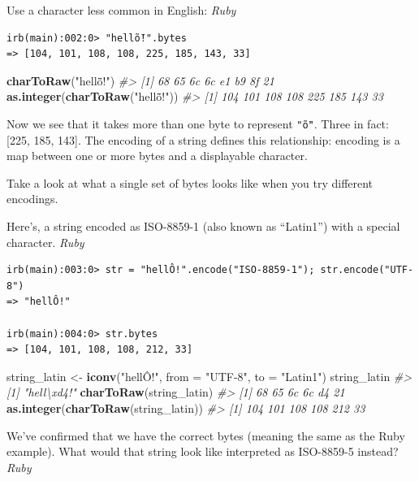 \documentclass[
]{book}
\newenvironment{Shaded}{\begin{snugshade}}{\end{snugshade}}
\newcommand{\CommentTok}[1]{\textcolor[rgb]{0.56,0.35,0.01}{\textit{#1}}}
\newcommand{\DataTypeTok}[1]{\textcolor[rgb]{0.13,0.29,0.53}{#1}}
\newcommand{\KeywordTok}[1]{\textcolor[rgb]{0.13,0.29,0.53}{\textbf{#1}}}
\newcommand{\NormalTok}[1]{#1}
\newcommand{\StringTok}[1]{\textcolor[rgb]{0.31,0.60,0.02}{#1}}
\begin{document}
Use a character less common in English: \emph{Ruby}

\begin{verbatim}
irb(main):002:0> "hellṏ!".bytes
=> [104, 101, 108, 108, 225, 185, 143, 33]
\end{verbatim}

\begin{Shaded}
\begin{Highlighting}[]
\KeywordTok{charToRaw}\NormalTok{(}\StringTok{"hellṏ!"}\NormalTok{)}
\CommentTok{#> [1] 68 65 6c 6c e1 b9 8f 21}
\KeywordTok{as.integer}\NormalTok{(}\KeywordTok{charToRaw}\NormalTok{(}\StringTok{"hellṏ!"}\NormalTok{))}
\CommentTok{#> [1] 104 101 108 108 225 185 143  33}
\end{Highlighting}
\end{Shaded}

Now we see that it takes more than one byte to represent \texttt{"ṏ"}. Three in fact: {[}225, 185, 143{]}. The encoding of a string defines this relationship: encoding is a map between one or more bytes and a displayable character.

Take a look at what a single set of bytes looks like when you try different encodings.

Here's, a string encoded as ISO-8859-1 (also known as ``Latin1'') with a special character. \emph{Ruby}

\begin{verbatim}
irb(main):003:0> str = "hellÔ!".encode("ISO-8859-1"); str.encode("UTF-8")
=> "hellÔ!"

irb(main):004:0> str.bytes
=> [104, 101, 108, 108, 212, 33]
\end{verbatim}

\begin{Shaded}
\begin{Highlighting}[]
\NormalTok{string_latin <-}\StringTok{ }\KeywordTok{iconv}\NormalTok{(}\StringTok{"hellÔ!"}\NormalTok{, }\DataTypeTok{from =} \StringTok{"UTF-8"}\NormalTok{, }\DataTypeTok{to =} \StringTok{"Latin1"}\NormalTok{)}
\NormalTok{string_latin}
\CommentTok{#> [1] "hell\textbackslash{}xd4!"}
\KeywordTok{charToRaw}\NormalTok{(string_latin)}
\CommentTok{#> [1] 68 65 6c 6c d4 21}
\KeywordTok{as.integer}\NormalTok{(}\KeywordTok{charToRaw}\NormalTok{(string_latin))}
\CommentTok{#> [1] 104 101 108 108 212  33}
\end{Highlighting}
\end{Shaded}

We've confirmed that we have the correct bytes (meaning the same as the Ruby example). What would that string look like interpreted as ISO-8859-5 instead? \emph{Ruby}
\end{document}
